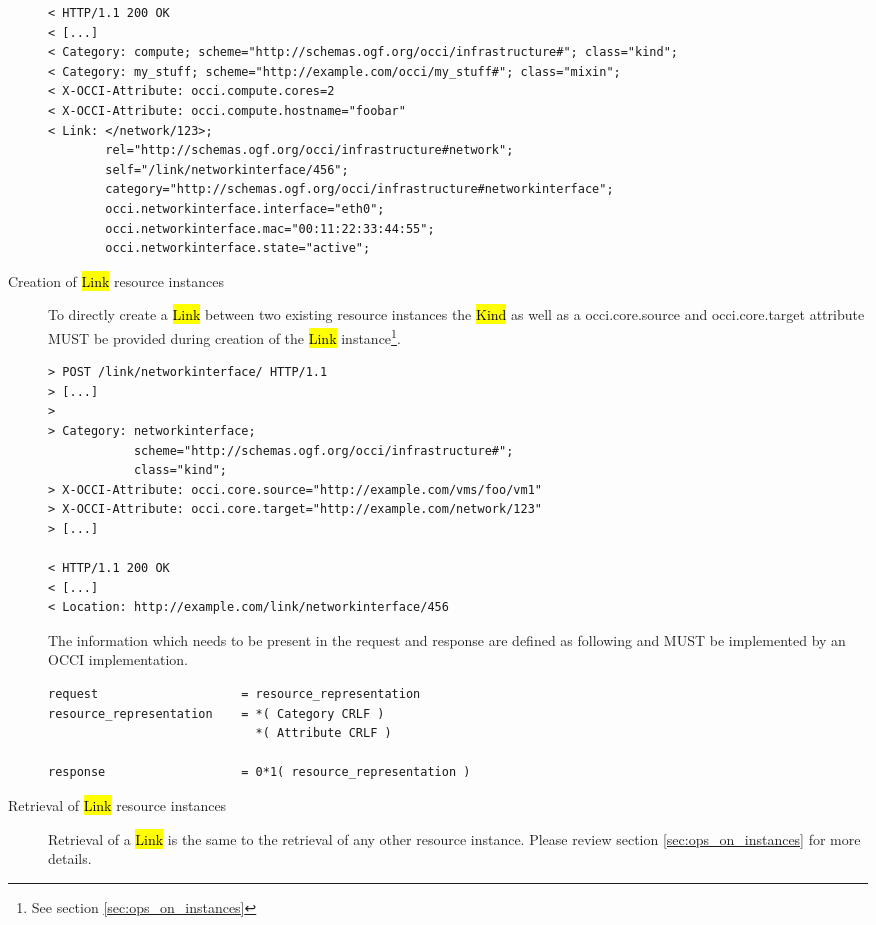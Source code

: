\documentclass[10pt,a4paper]{article}
\begin{document}
\begin{description}
\begin{verbatim}
< HTTP/1.1 200 OK
< [...]
< Category: compute; scheme="http://schemas.ogf.org/occi/infrastructure#"; class="kind";
< Category: my_stuff; scheme="http://example.com/occi/my_stuff#"; class="mixin";
< X-OCCI-Attribute: occi.compute.cores=2
< X-OCCI-Attribute: occi.compute.hostname="foobar"
< Link: </network/123>;
        rel="http://schemas.ogf.org/occi/infrastructure#network";
        self="/link/networkinterface/456";
        category="http://schemas.ogf.org/occi/infrastructure#networkinterface";
        occi.networkinterface.interface="eth0";
        occi.networkinterface.mac="00:11:22:33:44:55";
        occi.networkinterface.state="active";
\end{verbatim}

  \item[Creation of \hl{Link} resource instances] To directly create a
    \hl{Link} between two existing resource instances the \hl{Kind} as
    well as a occi.core.source and occi.core.target attribute MUST be
    provided during creation of the \hl{Link} instance\footnote{See
      section \ref{sec:ops_on_instances}}.

\begin{verbatim}
> POST /link/networkinterface/ HTTP/1.1
> [...]
> 
> Category: networkinterface; 
            scheme="http://schemas.ogf.org/occi/infrastructure#"; 
            class="kind"; 
> X-OCCI-Attribute: occi.core.source="http://example.com/vms/foo/vm1"
> X-OCCI-Attribute: occi.core.target="http://example.com/network/123"
> [...]
 
< HTTP/1.1 200 OK
< [...]
< Location: http://example.com/link/networkinterface/456
\end{verbatim}

    The information which needs to be present in the request and
    response are defined as following and MUST be implemented by an
    OCCI implementation.

\begin{verbatim}
request                    = resource_representation
resource_representation    = *( Category CRLF )
                             *( Attribute CRLF )

response                   = 0*1( resource_representation )
\end{verbatim}

  \item[Retrieval of \hl{Link} resource instances] Retrieval of a
    \hl{Link} is the same to the retrieval of any other resource
    instance. Please review section \ref{sec:ops_on_instances} for
    more details.


\end{description}
\end{document}
